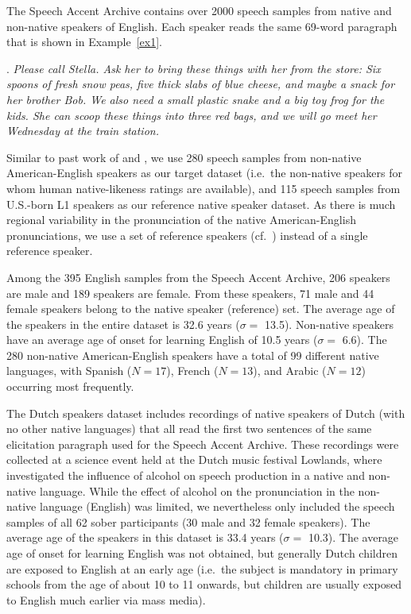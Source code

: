 \documentclass[11pt,a4paper]{article}
\begin{document}
The Speech Accent Archive contains over 2000 speech samples from native and non-native speakers of English. 
Each speaker reads the same 69-word paragraph that is shown in Example~\ref{ex1}.

\ex. \label{ex1} \textit{Please call Stella. Ask her to bring these things with her from the store: Six spoons of fresh snow peas, five thick slabs of blue cheese, and maybe a snack for her brother Bob. We also need a small plastic snake and a big toy frog for the kids. She can scoop these things into three red bags, and we will go meet her Wednesday at the train station.}

Similar to past work of \citet{wieling2014a} and \citet{acoustic-measure}, we use 280 speech samples from non-native American-English speakers as our target dataset (i.e.~the non-native speakers for whom human native-likeness ratings are available), and 115 speech samples from U.S.-born L1 speakers as our reference native speaker dataset.
As there is much regional variability in the pronunciation of the native American-English pronunciations, we use a set of reference speakers (cf.~\citealt{wieling2014a}) instead of a single reference speaker. 

Among the 395 English samples from the Speech Accent Archive, 206 speakers are male and 189 speakers are female.
From these speakers, 71 male and 44 female speakers belong to the native speaker (reference) set.
The average age of the speakers in the entire dataset is 32.6 years ($\sigma=$ 13.5). Non-native speakers have an average age of onset for learning English of 10.5 years ($\sigma=$ 6.6). The 280 non-native American-English speakers have a total of 99 different native languages, with Spanish ($N = 17$), French ($N = 13$), and Arabic ($N = 12$) occurring most frequently.

The Dutch speakers dataset includes recordings of native speakers of Dutch (with no other native languages) that all read the first two sentences of the same elicitation paragraph used for the Speech Accent Archive. 
These recordings were collected at a science event held at the Dutch music festival Lowlands, where \citet{wielinglowlands} investigated the influence of alcohol on speech production in a native and non-native language. While the effect of alcohol on the pronunciation in the non-native language (English) was limited, we nevertheless only included the speech samples of all 62 sober participants (30 male and 32 female speakers). The average age of the speakers in this dataset is 33.4 years ($\sigma=$ 10.3). The average age of onset for learning English was not obtained, but generally Dutch children are exposed to English at an early age (i.e.~the subject is mandatory in primary schools from the age of about 10 to 11 onwards, but children are usually exposed to English much earlier via mass media).
\end{document}
